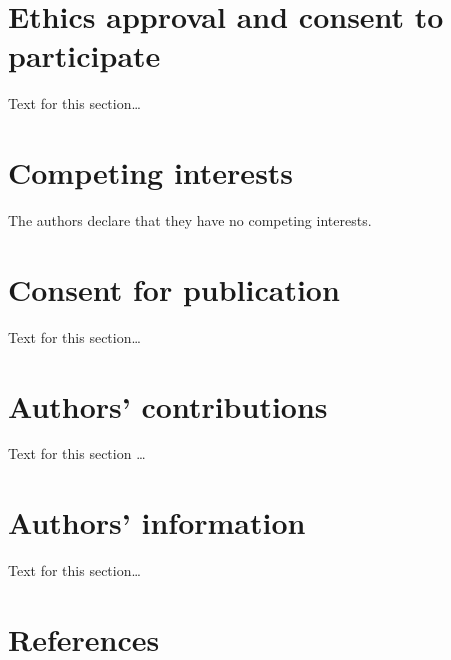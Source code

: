 \documentclass{bmcart}
\begin{document}
\begin{backmatter}
		\section*{Ethics approval and consent to participate}%
		Text for this section\ldots
		
		\section*{Competing interests}
		The authors declare that they have no competing interests.
		
		\section*{Consent for publication}%
		Text for this section\ldots
		
		\section*{Authors' contributions}
		Text for this section \ldots
		
		\section*{Authors' information}%
		Text for this section\ldots
		
		\section*{References}
		

\end{backmatter}
\end{document}
